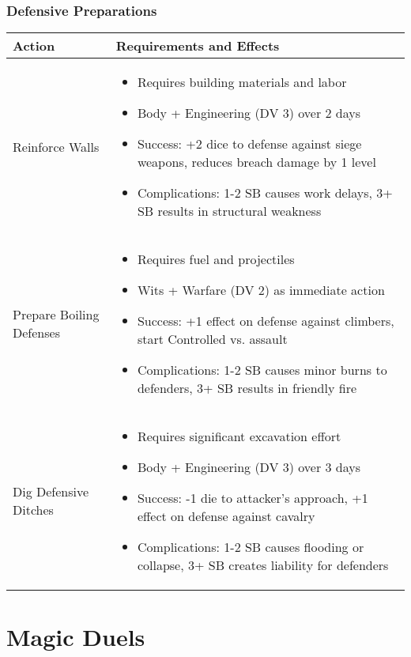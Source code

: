 \subsubsection{Defensive Preparations}
\begin{longtable}{|>{\raggedright\arraybackslash}p{4cm}|>{\raggedright\arraybackslash}p{8cm}|}
\hline
\textbf{Action} & \textbf{Requirements and Effects} \\
\hline
Reinforce Walls & 
\begin{itemize}
    \item Requires building materials and labor
    \item Body + Engineering (DV 3) over 2 days
    \item Success: +2 dice to defense against siege weapons, reduces breach damage by 1 level
    \item Complications: 1-2 SB causes work delays, 3+ SB results in structural weakness
\end{itemize} \\
\hline
Prepare Boiling Defenses & 
\begin{itemize}
    \item Requires fuel and projectiles
    \item Wits + Warfare (DV 2) as immediate action
    \item Success: +1 effect on defense against climbers, start Controlled vs. assault
    \item Complications: 1-2 SB causes minor burns to defenders, 3+ SB results in friendly fire
\end{itemize} \\
\hline
Dig Defensive Ditches & 
\begin{itemize}
    \item Requires significant excavation effort
    \item Body + Engineering (DV 3) over 3 days
    \item Success: -1 die to attacker's approach, +1 effect on defense against cavalry
    \item Complications: 1-2 SB causes flooding or collapse, 3+ SB creates liability for defenders
\end{itemize} \\
\hline
\end{longtable}

\newpage

\section{Magic Duels}

